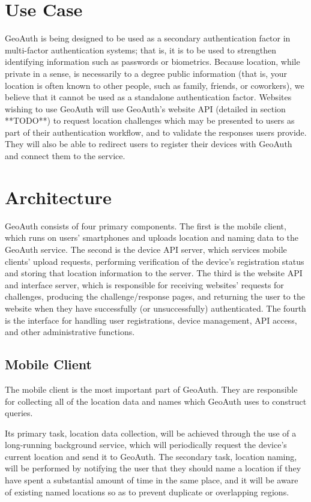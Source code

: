 \documentclass[11pt]{article} %
\begin{document}
\section{Use Case}
GeoAuth is being designed to be used as a secondary authentication factor in multi-factor authentication systems; that is, it is to be used to strengthen identifying information such as passwords or biometrics. Because location, while private in a sense, is necessarily to a degree public information (that is, your location is often known to other people, such as family, friends, or coworkers), we believe that it cannot be used as a standalone authentication factor. Websites wishing to use GeoAuth will use GeoAuth's website API (detailed in section **TODO**) to request location challenges which may be presented to users as part of their authentication workflow, and to validate the responses users provide. They will also be able to redirect users to register their devices with GeoAuth and connect them to the service.

\section{Architecture}
GeoAuth consists of four primary components. The first is the mobile client, which runs on users' smartphones and uploads location and naming data to the GeoAuth service. The second is the device API server, which services mobile clients' upload requests, performing verification of the device's registration status and storing that location information to the server. The third is the website API and interface server, which is responsible for receiving websites' requests for challenges, producing the challenge/response pages, and returning the user to the website when they have successfully (or unsuccessfully) authenticated. The fourth is the interface for handling user registrations, device management, API access, and other administrative functions.

\subsection{Mobile Client}
The mobile client is the most important part of GeoAuth. They are responsible for collecting all of the location data and names which GeoAuth uses to construct queries.

Its primary task, location data collection, will be achieved through the use of a long-running background service, which will periodically request the device's current location and send it to GeoAuth. The secondary task, location naming, will be performed by notifying the user that they should name a location if they have spent a substantial amount of time in the same place, and it will be aware of existing named locations so as to prevent duplicate or overlapping regions.
\end{document}
